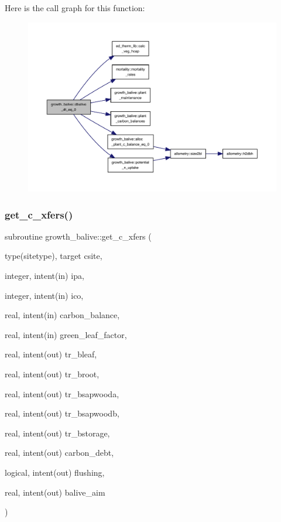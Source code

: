 Here is the call graph for this function\+:
\nopagebreak
\begin{figure}[H]
\begin{center}
\leavevmode
\includegraphics[width=350pt]{namespacegrowth__balive_a15cba39e9b70b8dd6a1e2d0cbdd5cc2e_cgraph}
\end{center}
\end{figure}
\mbox{\label{namespacegrowth__balive_a4a738e1e648a3932ae0beb2400c9bf78}} 
\subsubsection{\texorpdfstring{get\+\_\+c\+\_\+xfers()}{get\_c\_xfers()}}
{\footnotesize\ttfamily subroutine growth\+\_\+balive\+::get\+\_\+c\+\_\+xfers (\begin{DoxyParamCaption}\item[{type(sitetype), target}]{csite,  }\item[{integer, intent(in)}]{ipa,  }\item[{integer, intent(in)}]{ico,  }\item[{real, intent(in)}]{carbon\+\_\+balance,  }\item[{real, intent(in)}]{green\+\_\+leaf\+\_\+factor,  }\item[{real, intent(out)}]{tr\+\_\+bleaf,  }\item[{real, intent(out)}]{tr\+\_\+broot,  }\item[{real, intent(out)}]{tr\+\_\+bsapwooda,  }\item[{real, intent(out)}]{tr\+\_\+bsapwoodb,  }\item[{real, intent(out)}]{tr\+\_\+bstorage,  }\item[{real, intent(out)}]{carbon\+\_\+debt,  }\item[{logical, intent(out)}]{flushing,  }\item[{real, intent(out)}]{balive\+\_\+aim }\end{DoxyParamCaption})}



